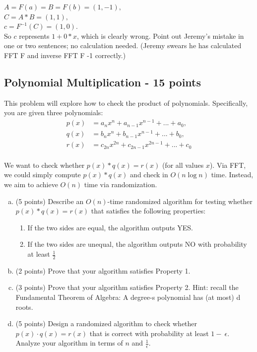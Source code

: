 \documentclass[12pt]{amsart}
\begin{document}
$A = F(a) = B = F(b) = (1, -1),$
\\

$C = A * B = (1, 1),$
\\

$c = F^{-1}(C) = (1, 0).$
\\

So $c$ represents $1 + 0 * x$, which is clearly wrong. Point out Jeremy's mistake in one or two sentences; no
calculation needed. (Jeremy swears he has calculated FFT F and inverse FFT F -1 correctly.) 
\\

\subsection{Polynomial Multiplication - 15 points}
This problem will explore how to check the product of polynomials. Specifically, you are given three polynomials: 
\begin{align*} 
p(x) &= a_nx^n + a_{n-1}x^{n-1} + ... + a_0,\\
q(x) &= b_nx^n + b_{n-1}x^{n-1} + ... + b_0,\\
r(x) &= c_{2n}x^{2n} + c_{2n-1}x^{2n-1} + ... + c_0
\end{align*}
\\

We want to check whether $p(x)* q(x) = r(x)$ (for all values $x$). Via FFT, we could simply compute
$p(x)* q(x)$ and check in $O(n \log n)$ time. Instead, we aim to achieve $O(n)$ time via randomization. 

\begin{enumerate}[(a)]
\item (5 points) Describe an $O(n)$-time randomized algorithm for testing whether $p(x) * q(x) = r(x)$ that satisfies the following properties:
\\

\begin{enumerate}[1.]
\item If the two sides are equal, the algorithm outputs YES.
\item If the two sides are unequal, the algorithm outputs NO with probability at least $\frac{1}{2}$
\\
\end{enumerate}

\item (2 points) Prove that your algorithm satisfies Property 1.
\\

\item (3 points) Prove that your algorithm satisfies Property 2. Hint: recall the Fundamental Theorem of Algebra: A degree-s polynomial has (at most) d roots. 
\\

\item (5 points) Design a randomized algorithm to check whether $p(x)· q(x) = r(x)$ that is correct with probability at least $1 - \: \epsilon$. Analyze your algorithm in terms of $n$ and $\frac{1}{\epsilon}$. 
\end{enumerate}
\end{document}
